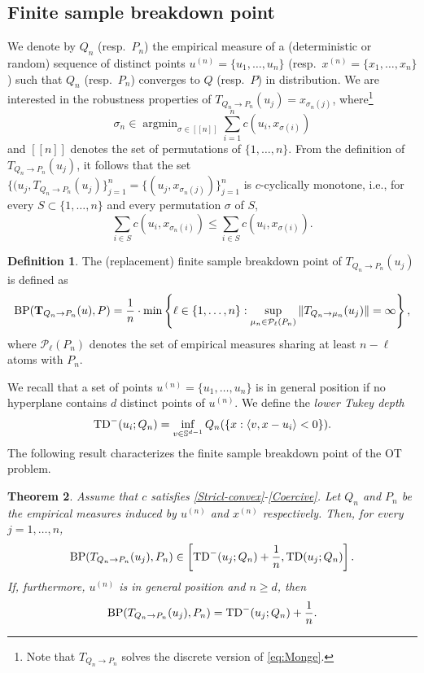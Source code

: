 \documentclass[11pt]{article}
\DeclareMathOperator*{\argmin}{argmin}
\theoremstyle{plain}
\newtheorem{theorem}{Theorem}[section]
\theoremstyle{definition}\newtheorem{definition}[theorem]{Definition}
\theoremstyle{remark}
\begin{document}
\subsection{Finite sample breakdown point}
We denote by $ Q_n$ (resp.~$P_n$) the empirical measure of a (deterministic or random) sequence of distinct points $u^{(n)}= \{u_1, \dots, u_n\}$ (resp.~$x^{(n)}=\{x_1, \dots, x_n\}$) such that $Q_n$ (resp.~$P_n$) converges to $Q$ (resp.~$P$)  in distribution. We are interested in the robustness properties of $ T_{Q_n\to P_n}(u_j)= x_{\sigma_{n}(j)}$, where\footnote{Note that $T_{Q_n\to P_n}$ solves the discrete version of \eqref{eq:Monge}.}  
%
\begin{equation}
    \label{eq:discrerte-OT}
    \sigma_n\in \argmin_{\sigma\in [[n]]} \sum_{i=1}^n c(u_i,x_{\sigma(i)}) 
\end{equation}
%
and $[[n]]$ denotes the set of permutations of $\{1, \dots, n\}$. From the definition of $T_{Q_n\to P_n}(u_j)$, it follows that the set $\{(u_j,T_{Q_n\to P_n}(u_j)\}_{j=1}^n=\{ (u_j, x_{\sigma_n(j)})\}_{j=1}^n $ is $c$-cyclically monotone, i.e., for every $S\subset \{1, \dots, n\}$ and every permutation  $\sigma$ of $S$, 
\begin{equation}
    \label{c-monotone-discrete}
   \sum_{i\in S} c(u_i,x_{\sigma_n(i)})  \leq \sum_{i\in S} c(u_i,x_{\sigma(i)}). 
\end{equation}
%
\begin{definition}
    The (replacement) finite sample breakdown point of $T_{Q_n\to P_n}(u_j)$  is defined as 
  $${\rm BP}({\bf T}_{Q_n\to P_n}(u), P)= \frac{1}{n}\cdot \min \left\{ \ell \in \{1 , \dots, n\}:  \sup_{\mu_n \in \mathcal{P}_\ell( P_n)} \|T_{Q_n\to \mu_n}(u_j)\| = \infty\right \},$$
  where $\mathcal{P}_\ell( P_n)$ denotes the set of empirical measures sharing at least $ n-\ell$ atoms with $P_n$.
\end{definition}
%
  We recall that a set of points  $u^{(n)}=\{u_1, \dots, u_n\}$ is in general position if no hyperplane contains  $d$ distinct points of 
  $u^{(n)}$.  We define the {\it lower Tukey depth} 
  $$ {\rm TD}^-(u_i;Q_n)=\inf_{v\in \mathbb{S}^{d-1}} Q_n(\{ x: \langle v, x-u_i\rangle < 0\}). 
  $$
   The following result characterizes the finite sample breakdown point of the OT problem.
   \begin{theorem}\label{Theorem:Discrete}
      Assume that $c$ satisfies \ref{Stricl-convex}-\ref{Coercive}.  Let $Q_n$ and $P_n$  be the empirical measures induced by $u^{(n)}$ and $x^{(n)}$ respectively.  Then, for every $j=1, \dots, n$, 
\begin{equation}
    \label{eq:discrete-BP}
     {\rm BP}({ T}_{Q_n\to P_n}(u_j), P_n) \in \left[ 
{\rm TD}^{-}(u_j;Q_n)+\frac{1}{n} , {\rm TD}(u_j;Q_n)\right] .
\end{equation}
If, furthermore, $u^{(n)}$ is in general position and $n\geq d$, then 
\begin{equation}
    \label{eq:General-Position-theorem}
    {\rm BP}({ T}_{Q_n\to P_n}(u_j), P_n) = 
{\rm TD}^{-}(u_j;Q_n)+\frac{1}{n}.
\end{equation}
  \end{theorem}
\end{document}
